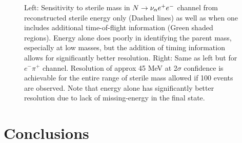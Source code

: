 \documentclass[11pt, a4paper]{article}
\def\ster{\ensuremath N}
\begin{document}
\begin{figure}[t]
\caption{\label{fig:tof_scatter}
Left: Sensitivity to sterile mass in $\ster \rightarrow \nu_\alpha e^+ e^-$ channel from reconstructed sterile energy only (Dashed lines) as well as
when one includes additional time-of-flight information (Green shaded regions).
Energy alone does poorly in identifying the parent mass, especially at low masses, but the addition of timing information allows for significantly better resolution.
Right: Same as left but for $e^- \pi^+$ channel. Resolution of approx 45 MeV at 2$\sigma$ confidence is achievable for
the entire range of sterile mass allowed if 100 events are observed. Note that energy alone has significantly better resolution due to lack of missing-energy in the final state. }

\end{figure}



\section{\label{sec:conclusions}Conclusions}
\end{document}
